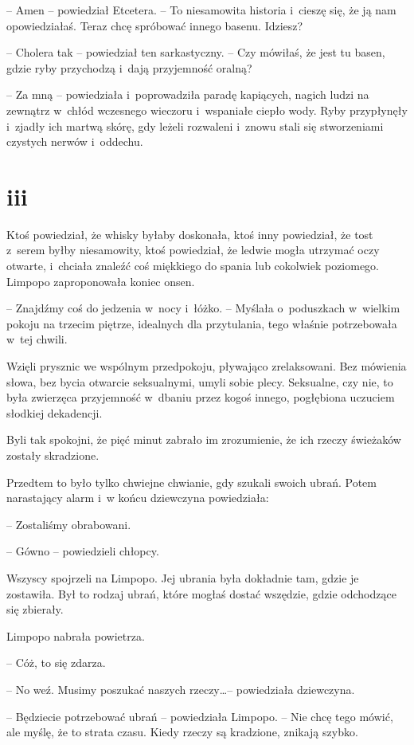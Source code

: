 \documentclass[oneside,polish,11pt,sfheadings]{mwbk}
\begin{document}
-- Amen -- powiedział Etcetera. -- To niesamowita historia i~cieszę się, że
ją nam opowiedziałaś. Teraz chcę spróbować innego basenu. Idziesz?

-- Cholera tak -- powiedział ten sarkastyczny. -- Czy mówiłaś, że jest tu
basen, gdzie ryby przychodzą i~dają przyjemność oralną?

-- Za mną -- powiedziała i~poprowadziła paradę kapiących, nagich ludzi na
zewnątrz w~chłód wczesnego wieczoru i~wspaniałe ciepło wody. Ryby
przypłynęły i~zjadły ich martwą skórę, gdy leżeli rozwaleni i~znowu
stali się stworzeniami czystych nerwów i~oddechu.

\chapter*{iii}

Ktoś powiedział, że whisky byłaby doskonała, ktoś inny powiedział, że
tost z~serem byłby niesamowity, ktoś powiedział, że ledwie mogła
utrzymać oczy otwarte, i~chciała znaleźć coś miękkiego do spania lub
cokolwiek poziomego. Limpopo zaproponowała koniec onsen. 

-- Znajdźmy coś do jedzenia w~nocy i~łóżko. -- Myślała o~poduszkach w~wielkim pokoju na
trzecim piętrze, idealnych dla przytulania, tego właśnie potrzebowała w~tej chwili.

Wzięli prysznic we wspólnym przedpokoju, pływająco zrelaksowani. Bez
mówienia słowa, bez bycia otwarcie seksualnymi, umyli sobie plecy.
Seksualne, czy nie, to była zwierzęca przyjemność w~dbaniu przez kogoś
innego, pogłębiona uczuciem słodkiej dekadencji.

Byli tak spokojni, że pięć minut zabrało im zrozumienie, że ich rzeczy
świeżaków zostały skradzione.

Przedtem to było tylko chwiejne chwianie, gdy szukali swoich ubrań.
Potem narastający alarm i~w końcu dziewczyna powiedziała: 

-- Zostaliśmy obrabowani. 

-- Gówno -- powiedzieli chłopcy. 

Wszyscy spojrzeli na Limpopo.
Jej ubrania była dokładnie tam, gdzie je zostawiła. Był to rodzaj ubrań,
które mogłaś dostać wszędzie, gdzie odchodzące się zbierały.

Limpopo nabrała powietrza. 

-- Cóż, to się zdarza.

-- No weź. Musimy poszukać naszych rzeczy\ldots  -- powiedziała dziewczyna.

-- Będziecie potrzebować ubrań -- powiedziała Limpopo. -- Nie chcę tego
mówić, ale myślę, że to strata czasu. Kiedy rzeczy są kradzione, znikają
szybko.
\end{document}

